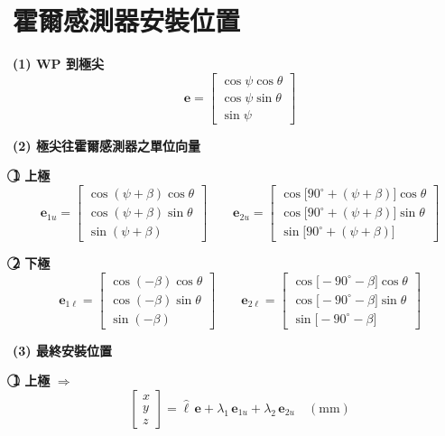 \documentclass[12pt]{article}
\begin{document}
\section*{霍爾感測器安裝位置}

\textbf{(1) WP 到極尖}
\[
\mathbf{e} =
\begin{bmatrix}
\cos\psi\cos\theta \\[2pt]
\cos\psi\sin\theta \\[2pt]
\sin\psi
\end{bmatrix}
\]

\vspace{6pt}
\textbf{(2) 極尖往霍爾感測器之單位向量}

\vspace{6pt}
\textbf{\textcircled{1} 上極}
\[
\mathbf{e}_{1u} =
\begin{bmatrix}
\cos(\psi+\beta)\cos\theta \\[2pt]
\cos(\psi+\beta)\sin\theta \\[2pt]
\sin(\psi+\beta)
\end{bmatrix}
\qquad
\mathbf{e}_{2u} =
\begin{bmatrix}
\cos\!\big[90^\circ+(\psi+\beta)\big]\cos\theta \\[2pt]
\cos\!\big[90^\circ+(\psi+\beta)\big]\sin\theta \\[2pt]
\sin\!\big[90^\circ+(\psi+\beta)\big]
\end{bmatrix}
\]

\vspace{6pt}
\textbf{\textcircled{2} 下極}
\[
\mathbf{e}_{1\ell} =
\begin{bmatrix}
\cos(-\beta)\cos\theta \\[2pt]
\cos(-\beta)\sin\theta \\[2pt]
\sin(-\beta)
\end{bmatrix}
\qquad
\mathbf{e}_{2\ell} =
\begin{bmatrix}
\cos\!\big[-90^\circ-\beta\big]\cos\theta \\[2pt]
\cos\!\big[-90^\circ-\beta\big]\sin\theta \\[2pt]
\sin\!\big[-90^\circ-\beta\big]
\end{bmatrix}
\]

\vspace{6pt}
\textbf{(3) 最終安裝位置}

\vspace{6pt}
\textbf{\textcircled{1} 上極} $\Rightarrow$
\[
\begin{bmatrix} x \\ y \\ z \end{bmatrix}
= \hat{\ell}\,\mathbf{e} + \lambda_1\,\mathbf{e}_{1u} + \lambda_2\,\mathbf{e}_{2u}
\quad (\mathrm{mm})
\]
\end{document}
